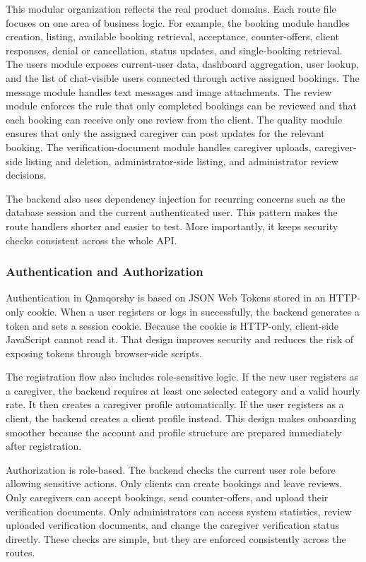 \documentclass[12pt,a4paper]{article}
\begin{document}
This modular organization reflects the real product domains. Each route file focuses on one area of business logic. For example, the booking module handles creation, listing, available booking retrieval, acceptance, counter-offers, client responses, denial or cancellation, status updates, and single-booking retrieval. The users module exposes current-user data, dashboard aggregation, user lookup, and the list of chat-visible users connected through active assigned bookings. The message module handles text messages and image attachments. The review module enforces the rule that only completed bookings can be reviewed and that each booking can receive only one review from the client. The quality module ensures that only the assigned caregiver can post updates for the relevant booking. The verification-document module handles caregiver uploads, caregiver-side listing and deletion, administrator-side listing, and administrator review decisions.

The backend also uses dependency injection for recurring concerns such as the database session and the current authenticated user. This pattern makes the route handlers shorter and easier to test. More importantly, it keeps security checks consistent across the whole API.

\subsubsection{Authentication and Authorization}

Authentication in Qamqorshy is based on JSON Web Tokens stored in an HTTP-only cookie. When a user registers or logs in successfully, the backend generates a token and sets a session cookie. Because the cookie is HTTP-only, client-side JavaScript cannot read it. That design improves security and reduces the risk of exposing tokens through browser-side scripts.

The registration flow also includes role-sensitive logic. If the new user registers as a caregiver, the backend requires at least one selected category and a valid hourly rate. It then creates a caregiver profile automatically. If the user registers as a client, the backend creates a client profile instead. This design makes onboarding smoother because the account and profile structure are prepared immediately after registration.

Authorization is role-based. The backend checks the current user role before allowing sensitive actions. Only clients can create bookings and leave reviews. Only caregivers can accept bookings, send counter-offers, and upload their verification documents. Only administrators can access system statistics, review uploaded verification documents, and change the caregiver verification status directly. These checks are simple, but they are enforced consistently across the routes.
\end{document}
